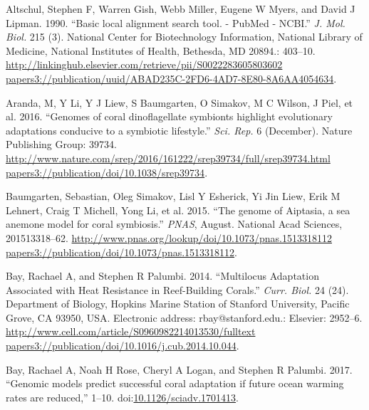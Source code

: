 \documentclass[]{elsarticle} %
\begin{document}
\hypertarget{ref-Altschul1990}{}
Altschul, Stephen F, Warren Gish, Webb Miller, Eugene W Myers, and David
J Lipman. 1990. ``Basic local alignment search tool. - PubMed - NCBI.''
\emph{J. Mol. Biol.} 215 (3). National Center for Biotechnology
Information, National Library of Medicine, National Institutes of
Health, Bethesda, MD 20894.: 403--10.
\href{http://linkinghub.elsevier.com/retrieve/pii/S0022283605803602\%20papers3://publication/uuid/ABAD235C-2FD6-4AD7-8E80-8A6AA4054634}{http://linkinghub.elsevier.com/retrieve/pii/S0022283605803602 papers3://publication/uuid/ABAD235C-2FD6-4AD7-8E80-8A6AA4054634}.

\hypertarget{ref-Aranda2016}{}
Aranda, M, Y Li, Y J Liew, S Baumgarten, O Simakov, M C Wilson, J Piel,
et al. 2016. ``Genomes of coral dinoflagellate symbionts highlight
evolutionary adaptations conducive to a symbiotic lifestyle.''
\emph{Sci. Rep.} 6 (December). Nature Publishing Group: 39734.
\href{http://www.nature.com/srep/2016/161222/srep39734/full/srep39734.html\%20papers3://publication/doi/10.1038/srep39734}{http://www.nature.com/srep/2016/161222/srep39734/full/srep39734.html papers3://publication/doi/10.1038/srep39734}.

\hypertarget{ref-Baumgarten2015}{}
Baumgarten, Sebastian, Oleg Simakov, Lisl Y Esherick, Yi Jin Liew, Erik
M Lehnert, Craig T Michell, Yong Li, et al. 2015. ``The genome of
Aiptasia, a sea anemone model for coral symbiosis.'' \emph{PNAS},
August. National Acad Sciences, 201513318--62.
\href{http://www.pnas.org/lookup/doi/10.1073/pnas.1513318112\%20papers3://publication/doi/10.1073/pnas.1513318112}{http://www.pnas.org/lookup/doi/10.1073/pnas.1513318112 papers3://publication/doi/10.1073/pnas.1513318112}.

\hypertarget{ref-Bay2014}{}
Bay, Rachael A, and Stephen R Palumbi. 2014. ``Multilocus Adaptation
Associated with Heat Resistance in Reef-Building Corals.'' \emph{Curr.
Biol.} 24 (24). Department of Biology, Hopkins Marine Station of
Stanford University, Pacific Grove, CA 93950, USA. Electronic address:
rbay@stanford.edu.: Elsevier: 2952--6.
\href{http://www.cell.com/article/S0960982214013530/fulltext\%20papers3://publication/doi/10.1016/j.cub.2014.10.044}{http://www.cell.com/article/S0960982214013530/fulltext papers3://publication/doi/10.1016/j.cub.2014.10.044}.

\hypertarget{ref-Bay2017}{}
Bay, Rachael A, Noah H Rose, Cheryl A Logan, and Stephen R Palumbi.
2017. ``Genomic models predict successful coral adaptation if future
ocean warming rates are reduced,'' 1--10.
doi:\href{https://doi.org/10.1126/sciadv.1701413}{10.1126/sciadv.1701413}.
\end{document}
